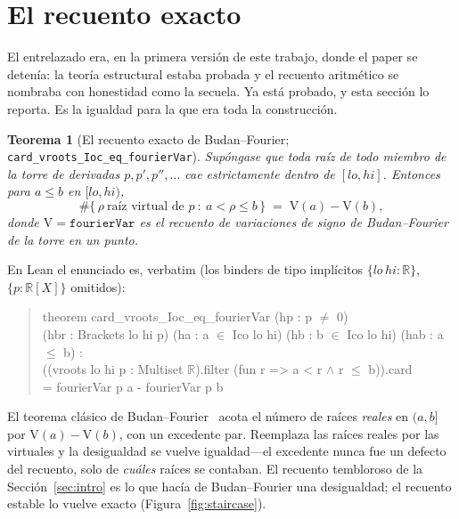 \documentclass[11pt]{article}
\newtheorem{theorem}{Teorema}
\newcommand{\lean}[1]{\texttt{#1}}
\newcommand{\R}{\mathbb{R}}
\newcommand{\V}{\mathrm{V}}
\begin{document}
\section{El recuento exacto}\label{sec:count}

El entrelazado era, en la primera versi\'on de este trabajo, donde el paper se deten\'ia: la teor\'ia
estructural estaba probada y el recuento aritm\'etico se nombraba con honestidad como la secuela. Ya
est\'a probado, y esta secci\'on lo reporta. Es la igualdad para la que era toda la construcci\'on.

\begin{theorem}[El recuento exacto de Budan--Fourier; \lean{card\_vroots\_Ioc\_eq\_fourierVar}]\label{thm:count}
Sup\'ongase que toda ra\'iz de todo miembro de la torre de derivadas $p,p',p'',\dots$ cae estrictamente
dentro de $[lo,hi]$. Entonces para $a\le b$ en $[lo,hi)$,
\[
  \#\{\,\rho\ \text{ra\'iz virtual de }p\ :\ a<\rho\le b\,\}\;=\;\V(a)-\V(b),
\]
donde $\V=\lean{fourierVar}$ es el recuento de variaciones de signo de Budan--Fourier de la torre en un
punto.
\end{theorem}

\noindent En Lean el enunciado es, verbatim (los binders de tipo impl\'icitos $\{lo\,hi:\R\}$,
$\{p:\R[X]\}$ omitidos):
\begin{quote}\ttfamily\small\noindent
theorem card\_vroots\_Ioc\_eq\_fourierVar (hp : p $\neq$ 0)\\
\hspace*{1em}(hbr : Brackets lo hi p) (ha : a $\in$ Ico lo hi) (hb : b $\in$ Ico lo hi) (hab : a $\le$ b) :\\
\hspace*{1em}((vroots lo hi p : Multiset $\mathbb{R}$).filter (fun r => a < r $\wedge$ r $\le$ b)).card\\
\hspace*{2em}= fourierVar p a - fourierVar p b
\end{quote}

\noindent El teorema cl\'asico de Budan--Fourier~\cite{bflean} acota el n\'umero de ra\'ices
\emph{reales} en $(a,b]$ por $\V(a)-\V(b)$, con un excedente par. Reemplaza las ra\'ices reales por las
virtuales y la desigualdad se vuelve igualdad---el excedente nunca fue un defecto del recuento, solo de
\emph{cu\'ales} ra\'ices se contaban. El recuento tembloroso de la Secci\'on~\ref{sec:intro} es lo que
hac\'ia de Budan--Fourier una desigualdad; el recuento estable lo vuelve exacto
(Figura~\ref{fig:staircase}).
\end{document}
